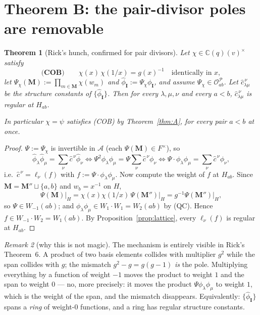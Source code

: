\documentclass[11pt]{article}
\theoremstyle{plain}
\newtheorem{thm}{Theorem}
\theoremstyle{definition}
\theoremstyle{remark}
\newtheorem{rem}[thm]{Remark}
\theoremstyle{plain}
\newcommand{\bI}{\mathbf{I}}
\newcommand{\bM}{\mathbf{M}}
\begin{document}
\section{Theorem B: the pair-divisor poles are removable}
\label{sec:B}

\begin{thm}[Rick's hunch, confirmed for pair divisors]\label{thm:B}
Let $\chi\in\mathbb{C}(q)(v)^\times$ satisfy
\[
  \textbf{(COB)}\qquad \chi(x)\,\chi(1/x)=g(x)^{-1}
  \quad\text{identically in }x,
\]
let $\Psi_\chi(\bM):=\prod_{m\in\bM}\chi(w_m)$ and
$\widehat\phi_{\bI}:=\Psi_\chi\phi_{\bI}$, and assume
$\Psi_\chi\in\mathcal{O}_{ab}^{\mathcal{P}}$.  Let
$\widehat c^{\,\nu}_{\lambda\mu}$ be the structure constants of
$\{\widehat\phi_{\bI}\}$.  Then for every $\lambda,\mu,\nu$ and every $a<b$,
$\widehat c^{\,\nu}_{\lambda\mu}$ is regular at $H_{ab}$.

In particular $\chi=\psi$ satisfies \textup{(COB)} by Theorem~\ref{thm:A}, for
every pair $a<b$ at once.
\end{thm}

\begin{proof}
$\Psi:=\Psi_\chi$ is invertible in $\mathcal{A}$ (each $\Psi(\bM)\in F^\times$),
so
\[
  \widehat\phi_\lambda\widehat\phi_\mu=\sum_\nu \widehat c^{\,\nu}\widehat\phi_\nu
  \iff
  \Psi^2\phi_\lambda\phi_\mu=\Psi\sum_\nu \widehat c^{\,\nu}\phi_\nu
  \iff
  \Psi\cdot\phi_\lambda\phi_\mu=\sum_\nu \widehat c^{\,\nu}\phi_\nu,
\]
i.e.\ $\widehat c^{\,\nu}=\ell_\nu(f)$ with $f:=\Psi\cdot\phi_\lambda\phi_\mu$.
Now compute the weight of $f$ at $H_{ab}$.  Since
$\bM=\bM''\sqcup\{a,b\}$ and $w_b=x^{-1}$ on $H$,
\[
  \Psi(\bM)\big|_{H}=\chi(x)\chi(1/x)\,\Psi(\bM'')\big|_{H}=g^{-1}\Psi(\bM'')\big|_{H},
\]
so $\Psi\in W_{-1}(ab)$; and $\phi_\lambda\phi_\mu\in W_1\cdot W_1=W_2(ab)$ by
(QC).  Hence $f\in W_{-1}\cdot W_2=W_1(ab)$.  By
Proposition~\ref{prop:lattice}, every $\ell_\nu(f)$ is regular at $H_{ab}$.
\end{proof}

\begin{rem}[why this is not magic]
The mechanism is entirely visible in Rick's Theorem~6.  A product of two basis
elements collides with multiplier $g^2$ while the span collides with $g$; the
mismatch $g^2-g=g(g-1)$ \emph{is} the pole.  Multiplying everything by a
function of weight $-1$ moves the product to weight $1$ and the span to weight
$0$ --- no, more precisely: it moves the product $\Psi\phi_\lambda\phi_\mu$ to
weight $1$, which is the weight of the span, and the mismatch disappears.
Equivalently: $\{\widehat\phi_{\bI}\}$ spans a \emph{ring} of weight-$0$
functions, and a ring has regular structure constants.
\end{rem}
\end{document}
